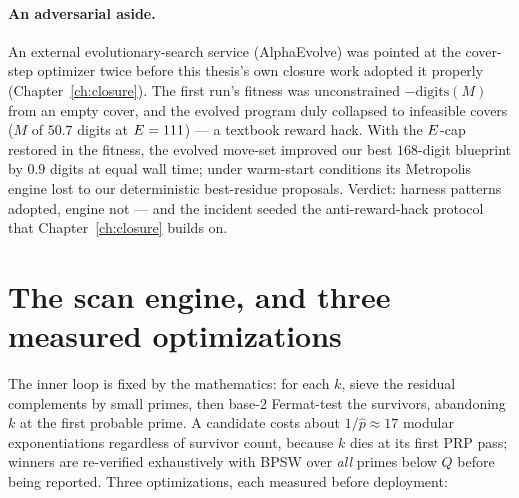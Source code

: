 \paragraph{An adversarial aside.} An external evolutionary-search
service (AlphaEvolve) was pointed at the cover-step optimizer twice
before this thesis's own closure work adopted it properly
(Chapter~\ref{ch:closure}). The first run's fitness was unconstrained
$-\mathrm{digits}(M)$ from an empty cover, and the evolved program
duly collapsed to infeasible covers ($M$ of $50.7$ digits at
$E=111$) --- a textbook reward hack. With the $E$-cap restored in
the fitness, the evolved move-set improved our best $168$-digit
blueprint by $0.9$ digits at equal wall time; under warm-start
conditions its Metropolis engine lost to our deterministic best-residue
proposals. Verdict: harness patterns adopted, engine not --- and the
incident seeded the anti-reward-hack protocol that
Chapter~\ref{ch:closure} builds on.

\section{The scan engine, and three measured optimizations}\label{sec:engine}

The inner loop is fixed by the mathematics: for each $k$, sieve the
residual complements by small primes, then base-2 Fermat-test the
survivors, abandoning $k$ at the first probable prime. A candidate
costs about $1/\hat p\approx17$ modular exponentiations regardless of
survivor count, because $k$ dies at its first PRP pass; winners are
re-verified exhaustively with BPSW over \emph{all} primes below $Q$
before being reported. Three optimizations, each measured before
deployment:

